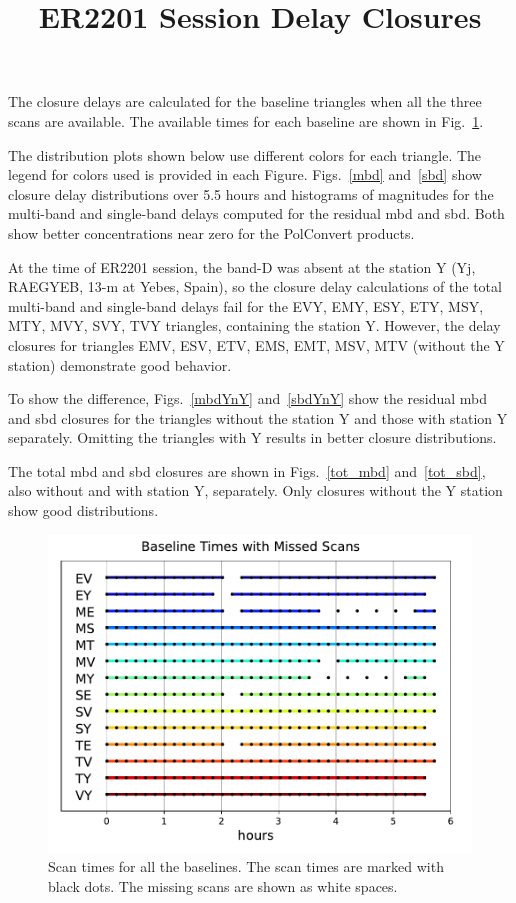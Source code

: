 \documentclass[letterpaper,twoside,12pt]{article}
\title{ER2201 Session Delay Closures}
\begin{document}
\maketitle

The closure delays are calculated for the baseline triangles when all the three scans are available. The available times for each baseline are shown in Fig.~\ref{time_gaps}.

The distribution plots shown below use different colors for each triangle. The legend for colors used is provided in each Figure. Figs.~\ref{mbd} and~\ref{sbd} show closure delay distributions over 5.5 hours and histograms of magnitudes for the multi-band and single-band delays computed for the residual mbd and sbd. Both show better concentrations near zero for the PolConvert products.

At the time of ER2201 session, the band-D was absent at the station Y (Yj, RAEGYEB, 13-m at Yebes, Spain), so the closure delay calculations of the total multi-band and single-band delays fail for the EVY, EMY, ESY, ETY, MSY, MTY, MVY, SVY, TVY triangles, containing the station Y. However, the delay closures for triangles EMV, ESV, ETV, EMS, EMT, MSV, MTV (without the Y station) demonstrate good behavior. 

To show the difference, Figs.~\ref{mbdYnY} and~\ref{sbdYnY} show the residual mbd and sbd closures for the triangles without the station Y and those with station Y separately. Omitting the triangles with Y results in better closure distributions. 

The total mbd and sbd closures are shown in Figs.~\ref{tot_mbd} and~\ref{tot_sbd}, also without and with station Y, separately. Only closures without the Y station show good distributions.  




\begin{figure}[h!]
  \centering
  \includegraphics[width=30pc]{Gaps_in_Time.pdf}
  \caption{\small Scan times for all the baselines. The scan times are marked with black dots. The missing scans are shown as white spaces. }
  \label{time_gaps}
\end{figure}
\end{document}
